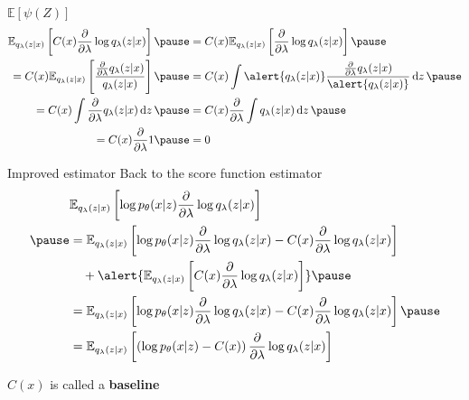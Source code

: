 \begin{frame}{$\mathbb E[\psi(Z)]$}
\begin{equation*}
\begin{aligned}
\mathbb E_{q_\lambda(z|x)} \left[ C(x)\pdv{\lambda}\log q_\lambda(z|x) \right] \pause &= C(x) \mathbb E_{q_\lambda(z|x)} \left[ \pdv{\lambda}\log q_\lambda(z|x) \right] \pause \\
= C(x) \mathbb E_{q_\lambda(z|x)} \left[ \frac{\pdv{\lambda} q_\lambda(z|x)}{q_\lambda(z|x)} \right] \pause &= C(x) \int  \alert{q_\lambda(z|x)} \frac{\pdv{\lambda} q_\lambda(z|x)}{ \alert{q_\lambda(z|x)}} \dd{z} \pause \\
=C(x) \int  \pdv{\lambda}  q_\lambda(z|x) \dd{z} \pause &= C(x) \pdv{\lambda} \int  q_\lambda(z|x) \dd{z} \pause \\
=C(x) \pdv{\lambda} 1 \pause &= 0
\end{aligned}
\end{equation*}

\end{frame}

\begin{frame}{Improved estimator}
Back to the score function estimator
\begin{equation*}
\begin{aligned}
&\mathbb E_{q_\lambda(z|x)} \left[  \log p_\theta(x|z)  \pdv{\lambda}\log q_\lambda(z|x)\right] \\ \pause
&= \mathbb E_{q_\lambda(z|x)} \left[  \log p_\theta(x|z)  \pdv{\lambda}\log q_\lambda(z|x) - C(x)\pdv{\lambda}\log q_\lambda(z|x) \right] \\
&\quad + \alert{\mathbb E_{q_\lambda(z|x)} \left[ C(x)\pdv{\lambda}\log q_\lambda(z|x) \right]} \pause \\
&=\mathbb E_{q_\lambda(z|x)} \left[  \log p_\theta(x|z)  \pdv{\lambda}\log q_\lambda(z|x) - C(x)\pdv{\lambda}\log q_\lambda(z|x) \right] \pause \\
&= \mathbb E_{q_\lambda(z|x)} \left[  \left( \log p_\theta(x|z) - C(x) \right)  \pdv{\lambda}\log q_\lambda(z|x) \right]
\end{aligned}
\end{equation*}

$C(x)$ is called a {\bf baseline}

\end{frame}



